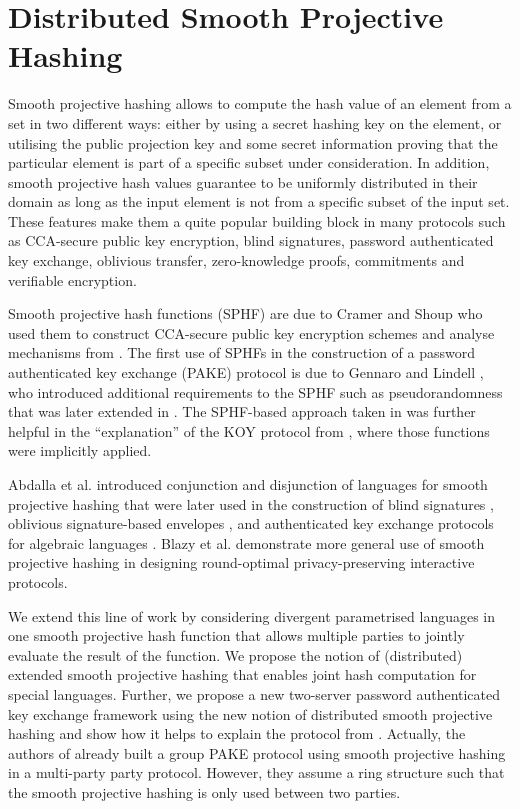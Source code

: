 \section{Distributed Smooth Projective Hashing}

\newcommand{\scaleFactor}{0.6}

Smooth projective hashing allows to compute the hash value of an element from a set in two different ways:
either by using a secret hashing key on the element, or utilising the public projection key and some secret information proving that the particular element is part of a specific subset under consideration.
In addition, smooth projective hash values guarantee to be uniformly distributed in their domain as long as the input element is not from a specific subset of the input set.
These features make them a quite popular building block in many protocols such as CCA-secure public key encryption, blind signatures, password authenticated key exchange, oblivious transfer, zero-knowledge proofs, commitments and verifiable encryption.

Smooth projective hash functions (SPHF) are due to Cramer and Shoup \cite{Cramer2002} who used them to construct CCA-secure public key encryption schemes and analyse mechanisms from \cite{Cramer_Shoup_1998}.
The first use of SPHFs in the construction of a password authenticated key exchange (PAKE) protocol is due to Gennaro and Lindell \cite{Gennaro2003}, who introduced additional requirements to the SPHF such as pseudorandomness that was later extended in \cite{Katz2011}.
The SPHF-based approach taken in \cite{Gennaro2003} was further helpful in the ``explanation'' of the KOY protocol from \cite{Katz_Ostrovsky_Yung_2001}, where those functions were implicitly applied.

Abdalla et al. \cite{Abdalla2009} introduced conjunction and disjunction of languages for smooth projective hashing that were later used in the construction of blind signatures \cite{Blazy2012,cryptoeprint:2013:034}, oblivious signature-based envelopes \cite{Blazy2012}, and authenticated key exchange protocols for algebraic languages \cite{Hamouda2013}.
Blazy et al. \cite{Blazy2012} demonstrate more general use of smooth projective hashing in designing round-optimal privacy-preserving interactive protocols.

We extend this line of work by %
considering divergent parametrised languages in one smooth projective hash function that allows multiple parties to jointly evaluate the result of the function. %
We propose the notion of (distributed) extended smooth projective hashing that enables joint hash computation for special languages.
Further, we propose a new two-server password authenticated key exchange framework using the new notion of distributed smooth projective hashing and show how it helps to explain the protocol from \cite{Katz_MacKenzie_Taban_Gligor_2005}.
Actually, the authors of \cite{AbdallaP06} already built a group PAKE protocol using smooth projective hashing in a multi-party party protocol.
However, they assume a ring structure such that the smooth projective hashing is only used between two parties.


